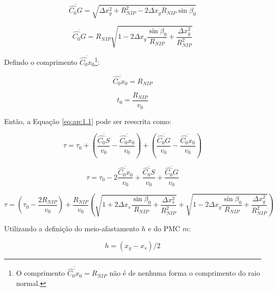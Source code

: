 \begin{equation}
 \label{eq:ap:1.18}
 \overline{\hat{C_0}G} = \sqrt{ \Delta x_{g}^2 + R_{NIP}^2 - 2 \Delta x_g R_{NIP} \sin{\beta_0} }
\end{equation}

\begin{equation}
 \label{eq:ap:1.19}
 \overline{\hat{C_0}G} = 
 R_{NIP} \sqrt{  1 - 2 \Delta x_g \frac{\sin{\beta_0}}{R_{NIP}} + \frac{\Delta x_{g}^2}{R_{NIP}^2} }
\end{equation}

Defindo o comprimento $\overline{\hat{C_0}x_0}$\footnote{O comprimento
$\overline{\hat{C_0}x_0} = R_{NIP}$ não é de nenhuma forma o comprimento do raio normal.}:

\begin{equation}
 \label{eq:ap:1.20}
 \overline{\hat{C_0}x_0} = R_{NIP}
\end{equation}

\begin{equation}
 \label{eq:ap:1.21}
t_0 = \frac{R_{NIP}}{v_0}
\end{equation}

Então, a Equação \ref{eq:ap:1.1} pode ser reescrita como:

\begin{equation}
 \label{eq:ap:1.22}
\tau = \tau_0 + \left( \frac{\overline{\hat{C_0}S}}{v_0} - \frac{\overline{\hat{C_0}x_0}}{v_0} \right)
+ \left( \frac{\overline{\hat{C_0}G}}{v_0} - \frac{\overline{\hat{C_0}x_0}}{v_0} \right)
\end{equation}

\begin{equation}
 \label{eq:ap:1.23}
\tau = \tau_0 - 2 \frac{\overline{\hat{C_0}x_0}}{v_0} + \frac{\overline{\hat{C_0}S}}{v_0}
+ \frac{\overline{\hat{C_0}G}}{v_0}
\end{equation}

\begin{equation}
 \label{eq:ap:1.24}
\tau = \left( \tau_0 - \frac{2 R_{NIP}}{v_0} \right)
+ \frac{R_{NIP}}{v_0} \left( \sqrt{  1 + 2 \Delta x_s \frac{\sin{\beta_0}}{R_{NIP}} + \frac{\Delta x_{s}^2}{R_{NIP}^2} }
+ \sqrt{  1 - 2 \Delta x_g \frac{\sin{\beta_0}}{R_{NIP}} + \frac{\Delta x_{g}^2}{R_{NIP}^2} } \right)
\end{equation}

Utilizando a definição do meio-afastamento $h$ e do PMC $m$: 

\begin{equation}
 \label{eq:ap:1.25}
 h=(x_g-x_s)/2
\end{equation}

